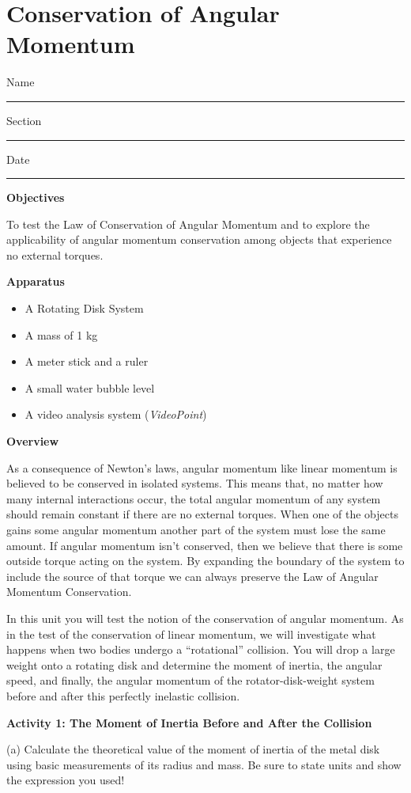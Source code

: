
\section{Conservation of Angular Momentum}

Name \rule{2.0in}{0.1pt}\hfill{}Section \rule{1.0in}{0.1pt}\hfill{}Date \rule{1.0in}{0.1pt}

\textbf{Objectives} 

To test the Law of Conservation of Angular Momentum and to explore the applicability
of angular momentum conservation among objects that experience no external torques. 

\textbf{Apparatus}

\begin{itemize}
\item A Rotating Disk System 
\item A mass of 1 kg 
\item A meter stick and a ruler 
\item A small water bubble level
\item A video analysis system (\textit{VideoPoint})
\end{itemize}
\textbf{Overview }

As a consequence of Newton's laws, angular momentum like linear momentum is
believed to be conserved in isolated systems. This means that, no matter how
many internal interactions occur, the total angular momentum of any system should
remain constant if there are no external torques. When one of the objects gains some angular momentum another
part of the system must lose the same amount. If angular momentum isn't conserved,
then we believe that there is some outside torque acting on the system. By expanding
the boundary of the system to include the source of that torque we can always
preserve the Law of Angular Momentum Conservation. 

In this unit you will test the notion of the conservation of angular momentum.
As in the test of the conservation of linear momentum, we will investigate what
happens when two bodies undergo a ``rotational'' collision.
You will drop a large weight onto a rotating disk and determine the moment of
inertia, the angular speed, and finally, the angular momentum of the rotator-disk-weight
system before and after this perfectly inelastic collision.

\textbf{Activity 1: The Moment of Inertia Before and After the Collision}

(a) Calculate the theoretical value of the moment of inertia of the metal disk
using basic measurements of its radius and mass. Be sure to state units and
show the expression you used!
\vspace{5mm}

